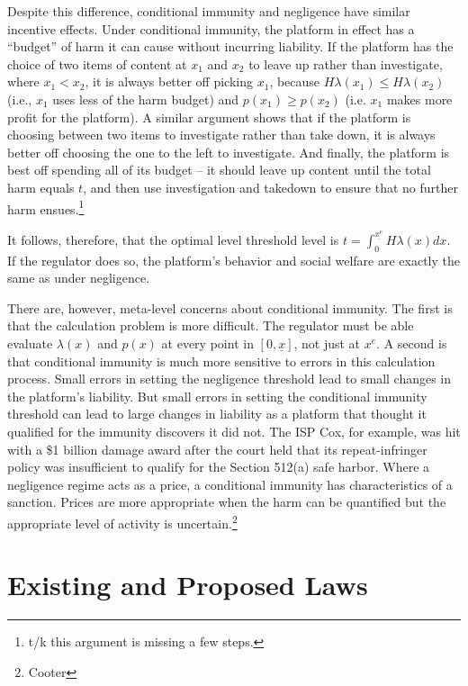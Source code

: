 Despite this difference, conditional immunity and negligence have similar incentive effects. Under conditional immunity, the platform in effect has a ``budget'' of harm it can cause without incurring liability. If the platform has the choice of two items of content at $x_1$ and $x_2$ to leave up rather than investigate, where $x_1 < x_2$, it is always better off picking $x_1$, because $H\lambda(x_1) \le H\lambda(x_2)$ (i.e., $x_1$ uses less of the harm budget) and $p(x_1) \ge p(x_2)$ (i.e. $x_1$ makes more profit for the platform). A similar argument shows that if the platform is choosing between two items to investigate rather than take down, it is always better off choosing the one to the left to investigate. And finally, the platform is best off spending all of its budget -- it should leave up content until the total harm equals $t$, and then use investigation and takedown to ensure that no further harm ensues.\footnote{t/k this argument is missing a few steps.}

It follows, therefore, that the optimal level threshold level is $t = \int_0^{\underline{x^e}} H\lambda(x) dx$. If the regulator does so, the platform's behavior and social welfare are exactly the same as under negligence.

There are, however, meta-level concerns about conditional immunity. The first is that the calculation problem is more difficult. The regulator must be able evaluate $\lambda(x)$ and $p(x)$ at every point in $[0, \underline{x}]$, not just at $x^e$. A second is that conditional immunity is much more sensitive to errors in this calculation process. Small errors in setting the negligence threshold lead to small changes in the platform's liability. But small errors in setting the conditional immunity threshold can lead to large changes in liability as a platform that thought it qualified for the immunity discovers it did not. The ISP Cox, for example, was hit with a \$1 billion damage award after the court held that its repeat-infringer policy was insufficient to qualify for the Section 512(a) safe harbor. Where a negligence regime acts as a price, a conditional immunity has characteristics of a sanction. Prices are more appropriate when the harm can be quantified but the appropriate level of activity is uncertain.\footnote{Cooter}

\section{Existing and Proposed Laws}
\label{sec:laws}



